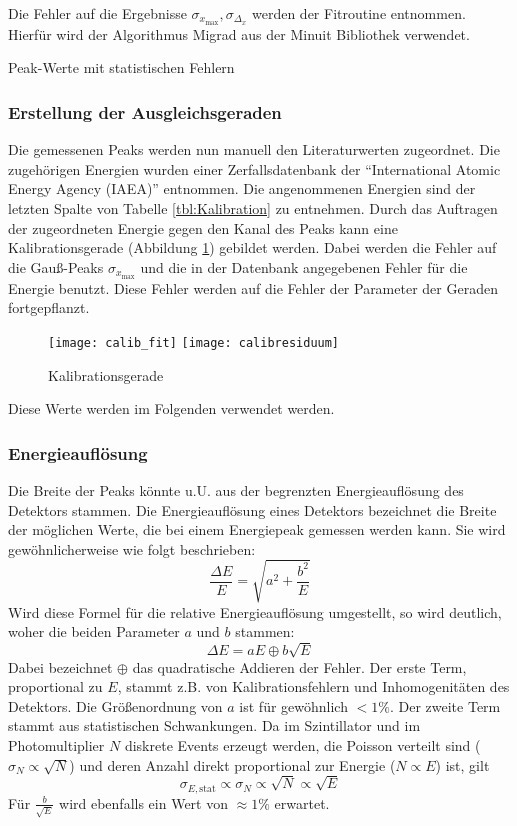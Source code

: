 \documentclass{../Misc/MontavonLaTeX/Montavon}
\newcommand{\halfwidth}{0.48\textwidth}
\begin{document}
Die Fehler auf die Ergebnisse $\sigma_{x_\textrm{max}}, \sigma_{\Delta_x}$ werden der Fitroutine entnommen. Hierfür wird der Algorithmus Migrad aus der Minuit Bibliothek verwendet.
\begin{table}[htbp]
\centering
\small
\makebox[\textwidth][c]{}
\caption{Peak-Werte mit statistischen Fehlern}
\label{tbl:Kalibration}
\end{table}

\subsubsection{Erstellung der Ausgleichsgeraden}
Die gemessenen Peaks werden nun manuell den Literaturwerten zugeordnet. Die zugehörigen Energien wurden einer Zerfallsdatenbank der \enquote{International Atomic Energy Agency (IAEA)}\cite{xgamma} entnommen. Die angenommenen Energien sind der letzten Spalte von Tabelle \ref{tbl:Kalibration} zu entnehmen. 
Durch das Auftragen der zugeordneten Energie gegen den Kanal des Peaks kann eine Kalibrationsgerade (Abbildung \ref{fig:Kalibrationsgerade}) gebildet werden. Dabei werden die Fehler auf die Gauß-Peaks $\sigma_{x_\textrm{max}}$ und die in der Datenbank angegebenen Fehler für die Energie benutzt. Diese Fehler werden auf die Fehler der Parameter der Geraden fortgepflanzt.
\begin{figure}[htbp]
\centering
\texttt{[image: calib\_fit]}
\texttt{[image: calibresiduum]}
\caption{Kalibrationsgerade}
\label{fig:Kalibrationsgerade}
\end{figure}


Diese Werte werden im Folgenden verwendet werden.

\subsubsection{Energieauflösung}
Die Breite der Peaks könnte u.U. aus der begrenzten Energieauflösung des Detektors stammen. 
Die Energieauflösung eines Detektors bezeichnet die Breite der möglichen Werte, die bei einem Energiepeak gemessen werden kann.
Sie wird gewöhnlicherweise wie folgt beschrieben:
\[
\frac{\Delta E}{E} = \sqrt{a^2 + \frac{b^2}{E}}
\]
Wird diese Formel für die relative Energieauflösung umgestellt, so wird deutlich, woher die beiden Parameter $a$ und $b$ stammen:
\[
\Delta E = a E \oplus b \sqrt{E}
\]
Dabei bezeichnet $\oplus$ das quadratische Addieren der Fehler.
Der erste Term, proportional zu $E$, stammt z.B. von Kalibrationsfehlern und Inhomogenitäten des Detektors. Die Größenordnung von $a$ ist für gewöhnlich $< 1 \unit{\%}$. 
Der zweite Term stammt aus  statistischen Schwankungen. Da im Szintillator und im Photomultiplier $N$ diskrete Events erzeugt werden, die Poisson verteilt sind ($\sigma_N \propto \sqrt{N}$) und deren Anzahl direkt proportional zur Energie ($N \propto E$) ist, gilt 
\[
\sigma_{E, \textrm{stat}} \propto \sigma_N \propto \sqrt{N} \propto \sqrt{E}
\]
Für $\frac{b}{\sqrt{E}}$ wird ebenfalls ein Wert von $\approx 1 \unit{\%}$ erwartet.
\end{document}

